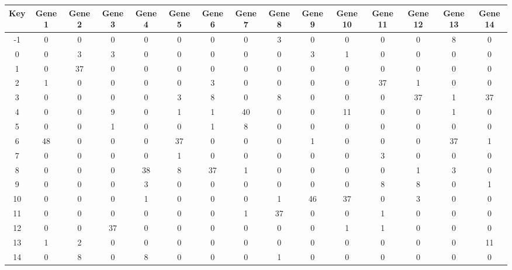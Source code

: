 \begin{tabular}{|c|c|c|c|c|c|c|c|c|c|c|c|c|c|c|}
\hline
Key & Gene 1 & Gene 2 & Gene 3 & Gene 4 & Gene 5 & Gene 6 & Gene 7 & Gene 8 & Gene 9 & Gene 10 & Gene 11 & Gene 12 & Gene 13 & Gene 14 \\
\hline
-1 & 0 & 0 & 0 & 0 & 0 & 0 & 0 & 3 & 0 & 0 & 0 & 0 & 8 & 0 \\
0 & 0 & 3 & 3 & 0 & 0 & 0 & 0 & 0 & 3 & 1 & 0 & 0 & 0 & 0 \\
1 & 0 & 37 & 0 & 0 & 0 & 0 & 0 & 0 & 0 & 0 & 0 & 0 & 0 & 0 \\
2 & 1 & 0 & 0 & 0 & 0 & 3 & 0 & 0 & 0 & 0 & 37 & 1 & 0 & 0 \\
3 & 0 & 0 & 0 & 0 & 3 & 8 & 0 & 8 & 0 & 0 & 0 & 37 & 1 & 37 \\
4 & 0 & 0 & 9 & 0 & 1 & 1 & 40 & 0 & 0 & 11 & 0 & 0 & 1 & 0 \\
5 & 0 & 0 & 1 & 0 & 0 & 1 & 8 & 0 & 0 & 0 & 0 & 0 & 0 & 0 \\
6 & 48 & 0 & 0 & 0 & 37 & 0 & 0 & 0 & 1 & 0 & 0 & 0 & 37 & 1 \\
7 & 0 & 0 & 0 & 0 & 1 & 0 & 0 & 0 & 0 & 0 & 3 & 0 & 0 & 0 \\
8 & 0 & 0 & 0 & 38 & 8 & 37 & 1 & 0 & 0 & 0 & 0 & 1 & 3 & 0 \\
9 & 0 & 0 & 0 & 3 & 0 & 0 & 0 & 0 & 0 & 0 & 8 & 8 & 0 & 1 \\
10 & 0 & 0 & 0 & 1 & 0 & 0 & 0 & 1 & 46 & 37 & 0 & 3 & 0 & 0 \\
11 & 0 & 0 & 0 & 0 & 0 & 0 & 1 & 37 & 0 & 0 & 1 & 0 & 0 & 0 \\
12 & 0 & 0 & 37 & 0 & 0 & 0 & 0 & 0 & 0 & 1 & 1 & 0 & 0 & 0 \\
13 & 1 & 2 & 0 & 0 & 0 & 0 & 0 & 0 & 0 & 0 & 0 & 0 & 0 & 11 \\
14 & 0 & 8 & 0 & 8 & 0 & 0 & 0 & 1 & 0 & 0 & 0 & 0 & 0 & 0 \\
\hline
\end{tabular}